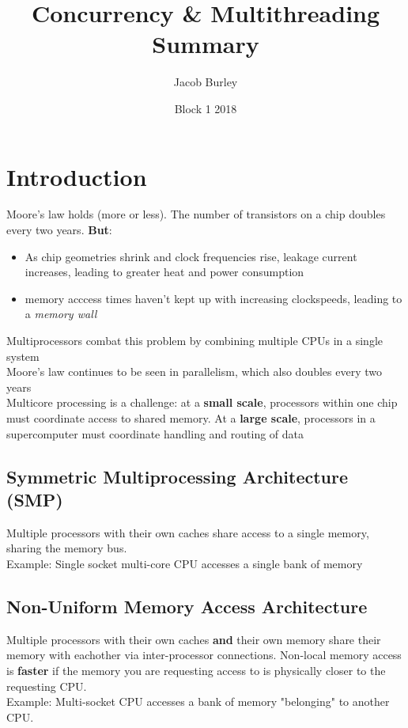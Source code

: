 \documentclass{article}
\title{Concurrency \& Multithreading Summary}
\author{Jacob Burley}
\date{Block 1 2018}
\begin{document}
\maketitle

\tableofcontents
%
%
\section{Introduction}
Moore's law holds (more or less). The number of transistors on a chip doubles every two years. \textbf{But}:
\begin{itemize}
    \item As chip geometries shrink and clock frequencies rise, leakage current increases, leading to greater heat and power consumption
    \item memory acccess times haven't kept up with increasing clockspeeds, leading to a \textit{memory wall}
\end{itemize}
Multiprocessors combat this problem by combining multiple CPUs in a single system
\\Moore's law continues to be seen in parallelism, which also doubles every two years
\\Multicore processing is a challenge: at a \textbf{small scale}, processors within one chip must coordinate access to shared memory. At a \textbf{large scale}, processors in a supercomputer must coordinate handling and routing of data
\subsection{Symmetric Multiprocessing Architecture (SMP)}
Multiple processors with their own caches share access to a single memory, sharing the memory bus.
\\Example: Single socket multi-core CPU accesses a single bank of memory

\subsection{Non-Uniform Memory Access Architecture}
Multiple processors with their own caches \textbf{and} their own memory share their memory with eachother via inter-processor connections. Non-local memory access is \textbf{faster} if the memory you are requesting access to is physically closer to the requesting CPU.
\\Example: Multi-socket CPU accesses a bank of memory "belonging" to another CPU.
\end{document}
